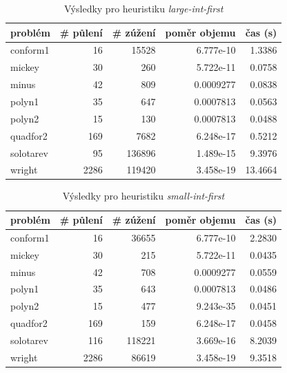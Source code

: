 {\begin{table}[H]
\centering
\begin{tabular}{lrrrr}
\hline
problém & \# půlení & \# zúžení & poměr objemu & čas (s) \\ \hline
conform1 & 16 & 15528 & 6.777e-10 & 1.3386 \\
mickey & 30 & 260 & 5.722e-11 & 0.0758 \\
minus & 42 & 809 & 0.0009277 & 0.0838 \\
polyn1 & 35 & 647 & 0.0007813 & 0.0563 \\
polyn2 & 15 & 130 & 0.0007813 & 0.0488 \\
quadfor2 & 169 & 7682 & 6.248e-17 & 0.5212 \\
solotarev & 95 & 136896 & 1.489e-15 & 9.3976 \\
wright & 2286 & 119420 & 3.458e-19 & 13.4664 \\
\end{tabular}
\caption{Výsledky pro heuristiku \emph{large-int-first}}
\label{large-int-first}
\end{table}



\begin{table}[H]
\centering
\begin{tabular}{lrrrr}
\hline
problém & \# půlení & \# zúžení & poměr objemu & čas (s) \\ \hline
conform1 & 16 & 36655 & 6.777e-10 & 2.2830 \\
mickey & 30 & 215 & 5.722e-11 & 0.0435 \\
minus & 42 & 708 & 0.0009277 & 0.0559 \\
polyn1 & 35 & 643 & 0.0007813 & 0.0486 \\
polyn2 & 15 & 477 & 9.243e-35 & 0.0451 \\
quadfor2 & 169 & 159 & 6.248e-17 & 0.0458 \\
solotarev & 116 & 118221 & 3.669e-16 & 8.2039 \\
wright & 2286 & 86619 & 3.458e-19 & 9.3518 \\
\end{tabular}
\caption{Výsledky pro heuristiku \emph{small-int-first}}
\label{small-int-first}
\end{table}



}
